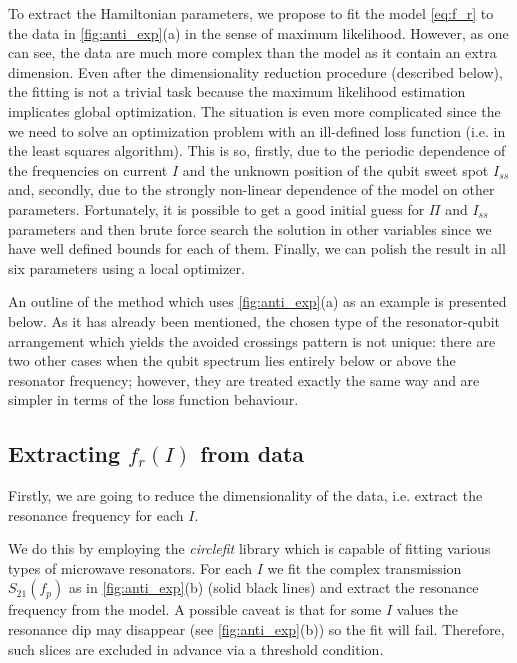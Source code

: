 \documentclass[%
 aip,
 draft,
 amsmath,amssymb,
 reprint,%
]{revtex4-1}
\begin{document}
To extract the Hamiltonian parameters, we propose to fit the model \eqref{eq:f_r} to the data in \autoref{fig:anti_exp}(a) in the sense of maximum likelihood. However, as one can see, the data are much more complex than the model as it contain an extra dimension. Even after the dimensionality reduction procedure (described below), the fitting is not a trivial task because the maximum likelihood estimation implicates global optimization. The situation is even more complicated since the we need to solve an optimization problem with an ill-defined loss function (i.e. in the least squares algorithm). This is so, firstly, due to the periodic dependence of the frequencies on current $I$ and the unknown position of the qubit sweet spot $I_{ss}$ and, secondly, due to the strongly non-linear dependence of the model on other parameters. Fortunately, it is possible to get a good initial guess for $\Pi$ and $I_{ss}$ parameters and then brute force search the solution in other variables since we have well defined bounds for each of them. Finally, we can polish the result in all six parameters using a local optimizer.

An outline of the method which uses \autoref{fig:anti_exp}(a) as an example is presented below. As it has already been mentioned, the chosen type of the resonator-qubit arrangement which yields the avoided crossings pattern is not unique: there are two other cases when the qubit spectrum lies entirely below or above the resonator frequency; however, they are treated exactly the same way and are simpler in terms of the loss function behaviour.

\subsection{Extracting $f_r(I)$ from data}\label{sec:extract_fr}

Firstly, we are going to reduce the dimensionality of the data, i.e. extract the resonance frequency for each $I$.

We do this by employing the \textit{circlefit}\cite{probst2015} library which is capable of fitting various types of microwave resonators. For each $I$ we fit the complex transmission $S_{21}(f_p)$ as in \autoref{fig:anti_exp}(b) (solid black lines) and extract the resonance frequency from the model. A possible caveat is that for some $I$ values the resonance dip may disappear (see \autoref{fig:anti_exp}(b)) so the fit will fail. Therefore, such slices are excluded in advance via a threshold condition.
\end{document}
